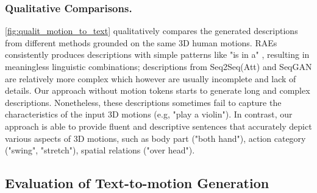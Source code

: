 \documentclass[runningheads]{llncs}
\newcommand{\beforesubsection}{\vspace{-2mm}}
\newcommand{\aftersubsection}{\vspace{-2mm}}
\begin{document}
\subsubsection{Qualitative Comparisons.} \cref{fig:qualit_motion_to_text} qualitatively compares the generated descriptions from different methods grounded on the same 3D human motions. RAEs~\cite{plappert2018learning} consistently produces descriptions with simple patterns like "is in a" , resulting in meaningless linguistic combinations; descriptions from Seq2Seq(Att) and SeqGAN are relatively more complex which however are usually incomplete and lack of details. Our approach without motion tokens starts to generate long and complex descriptions. Nonetheless, these descriptions sometimes fail to capture the characteristics of the input 3D motions (e.g, "play a violin"). In contrast, our approach is able to provide fluent and descriptive sentences that accurately depict various aspects of 3D motions, such as body part ("both hand"), action category ("swing", "stretch"), spatial relations ("over head").

\beforesubsection
\subsection{Evaluation of Text-to-motion Generation}
\aftersubsection
\label{exp:text-to-motion}
\end{document}
